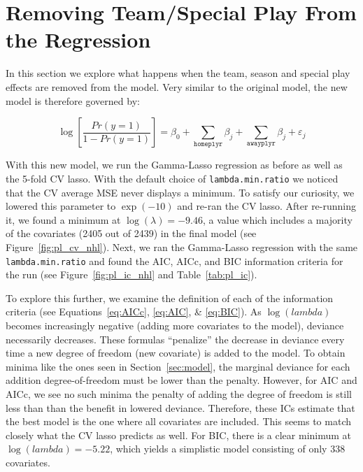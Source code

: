 \documentclass[11pt, fleqn]{article}
\begin{document}
\section{Removing Team/Special Play From the Regression}

In this section we explore what happens when the team, season and special play effects are removed from the model.  Very similar to the original model, the new model is therefore governed by:

\[ \log\left[\frac{Pr(y=1)}{1-Pr(y=1)}\right] = \beta_0 + \sum_{\texttt{homeplyr}} \beta_j + \sum_{\texttt{awayplyr}} \beta_j + \varepsilon_j \]

With this new model, we run the Gamma-Lasso regression as before as well as the 5-fold CV lasso.  With the default choice of \texttt{lambda.min.ratio} we noticed that the CV average MSE never displays a minimum.  To satisfy our curiosity, we lowered this parameter to $\exp(-10)$ and re-ran the CV lasso.  After re-running it, we found a minimum at $\log(\lambda)=-9.46$, a value which includes a majority of the covariates (2405 out of 2439) in the final model (see Figure~\vref{fig:pl_cv_nhl}).  Next, we ran the Gamma-Lasso regression with the same \texttt{lambda.min.ratio} and found the AIC, AICc, and BIC information criteria for the run (see Figure~\ref{fig:pl_ic_nhl} and Table~\vref{tab:pl_ic}).

To explore this further, we examine the definition of each of the information criteria (see Equations~\eqref{eq:AICc}, \eqref{eq:AIC}, \& \eqref{eq:BIC}).  As $\log(lambda)$ becomes increasingly negative (adding more covariates to the model), deviance necessarily decreases.  These formulas ``penalize'' the decrease in deviance every time a new degree of freedom (new covariate) is added to the model.  To obtain minima like the ones seen in Section~\ref{sec:model}, the marginal deviance for each addition degree-of-freedom must be lower than the penalty.  However, for AIC and AICc, we see no such minima \textemdash the penalty of adding the degree of freedom is still less than than the benefit in lowered deviance.  Therefore, these ICs estimate that the best model is the one where all covariates are included.  This seems to match closely what the CV lasso predicts as well.  For BIC, there is a clear minimum at $\log(lambda)=-5.22$, which yields a simplistic model consisting of only 338 covariates.


\end{document}
